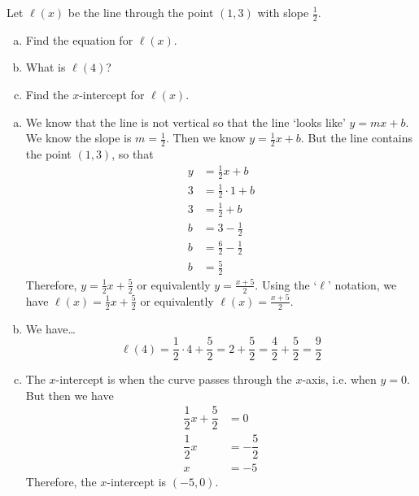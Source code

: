\documentclass[11pt,letterpaper]{article}
\begin{document}
\newpage





 Let $\ell(x)$ be the line through the point $(1, 3)$ with slope $\frac{1}{2}$.
	\begin{enumerate}[(a)]
	\item Find the equation for $\ell(x)$. 
	\item What is $\ell(4)$?
	\item Find the $x$-intercept for $\ell(x)$. 
	\end{enumerate} \pspace

\sol
{\itshape
\begin{enumerate}[(a)]
\item We know that the line is not vertical so that the line `looks like' $y= mx + b$. We know the slope is $m= \frac{1}{2}$. Then we know $y= \frac{1}{2} x + b$. But the line contains the point $(1, 3)$, so that
	\[
	\begin{aligned}
	y&= \frac{1}{2}x + b \\
	3&= \frac{1}{2} \cdot 1 + b \\
	3&= \frac{1}{2} + b \\
	b&= 3 - \frac{1}{2} \\
	b&= \frac{6}{2} - \frac{1}{2} \\
	b&= \frac{5}{2} 
	\end{aligned}
	\]
Therefore, $y= \frac{1}{2}x + \frac{5}{2}$ or equivalently $y= \frac{x + 5}{2}$. Using the `$\ell$' notation, we have $\ell(x)= \frac{1}{2}x + \frac{5}{2}$ or equivalently $\ell(x)= \frac{x + 5}{2}$. \pspace


\item We have\dots
	\[
	\ell(4)= \dfrac{1}{2} \cdot 4 + \dfrac{5}{2}= 2 + \dfrac{5}{2}= \dfrac{4}{2} + \dfrac{5}{2}= \dfrac{9}{2}
	\] \pspace


\item The $x$-intercept is when the curve passes through the $x$-axis, i.e. when $y= 0$. But then we have
	\[
	\begin{aligned}
	\dfrac{1}{2}x + \dfrac{5}{2}&= 0 \\
	\dfrac{1}{2}x&= -\dfrac{5}{2} \\
	x&= -5
	\end{aligned}
	\]
Therefore, the $x$-intercept is $(-5, 0)$. 
\end{enumerate}
}





\newpage
\end{document}
